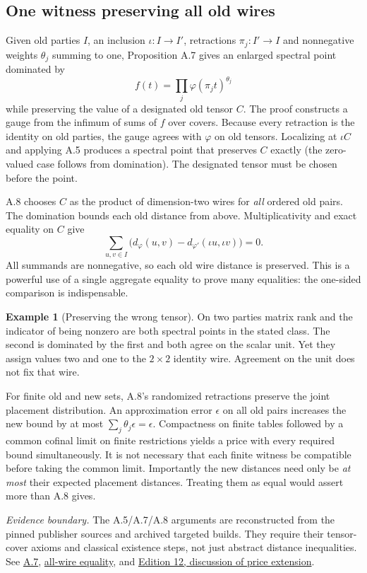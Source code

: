 \documentclass[11pt,letterpaper]{article}
\theoremstyle{definition}\newtheorem{definition}[theorem]{Definition}\newtheorem{example}[theorem]{Example}
\theoremstyle{remark}\newtheorem{remark}[theorem]{Remark}
\newcommand{\pub}[3]{\href{https://github.com/anthropics/formal-math/blob/11b6c7e3c927df2658f513b6b68ea7f8929c62c5/vp-vnp/#1\#L#2}{#3}}
\newcommand{\aud}[2]{\href{https://github.com/nousentllc/VP-VNP-Review/blob/567303d0bcf4f9d54390437b137752446e58ccd6/#1}{#2}}
\newcommand{\scope}[1]{\par\smallskip\noindent\textit{Evidence boundary.} #1\par\smallskip}
\begin{document}
\subsection{One witness preserving all old wires}\label{sec:extension}
Given old parties $I$, an inclusion $\iota:I\to I'$, retractions $\pi_j:I'\to I$ and nonnegative weights $\theta_j$ summing to one, Proposition A.7 gives an enlarged spectral point dominated by
\[
 f(t)=\prod_j\varphi(\pi_j t)^{\theta_j}
\]
while preserving the value of a designated old tensor $C$. The proof constructs a gauge from the infimum of sums of $f$ over covers. Because every retraction is the identity on old parties, the gauge agrees with $\varphi$ on old tensors. Localizing at $\iota C$ and applying A.5 produces a spectral point that preserves $C$ exactly (the zero-valued case follows from domination). The designated tensor must be chosen before the point.

A.8 chooses $C$ as the product of dimension-two wires for \emph{all} ordered old pairs. The domination bounds each old distance from above. Multiplicativity and exact equality on $C$ give
\[
 \sum_{u,v\in I}\bigl(d_\varphi(u,v)-d_{\varphi'}(\iota u,\iota v)\bigr)=0.
\]
All summands are nonnegative, so each old wire distance is preserved. This is a powerful use of a single aggregate equality to prove many equalities: the one-sided comparison is indispensable.
\begin{example}[Preserving the wrong tensor]
On two parties matrix rank and the indicator of being nonzero are both spectral points in the stated class. The second is dominated by the first and both agree on the scalar unit. Yet they assign values two and one to the $2\times2$ identity wire. Agreement on the unit does not fix that wire.
\end{example}
For finite old and new sets, A.8's randomized retractions preserve the joint placement distribution. An approximation error $\epsilon$ on all old pairs increases the new bound by at most $\sum_j\theta_j\epsilon=\epsilon$. Compactness on finite tables followed by a common cofinal limit on finite restrictions yields a price with every required bound simultaneously. It is not necessary that each finite witness be compatible before taking the common limit. Importantly the new distances need only be \emph{at most} their expected placement distances. Treating them as equal would assert more than A.8 gives.

\scope{The A.5/A.7/A.8 arguments are reconstructed from the pinned publisher sources and archived targeted builds. They require their tensor-cover axioms and classical existence steps, not just abstract distance inequalities. See \pub{Paper/Extension.lean}{166}{A.7}, \pub{Paper/Prices.lean}{160}{all-wire equality}, and \aud{report/VP_VNP_Research_Review.pdf}{Edition 12, discussion of price extension}.}
\end{document}

